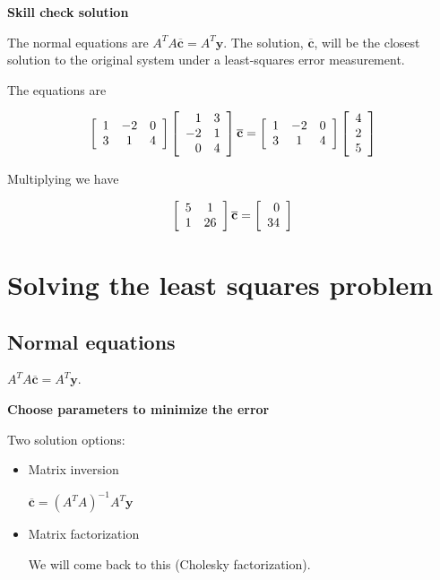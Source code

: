 \documentclass[12pt,letterpaper,noanswers]{exam}
\begin{document}
\noindent \textbf{Skill check solution}
\begin{questions}
\item The normal equations are $A^TA\overline{\mathbf{c}} = A^T\mathbf{y}$.  The solution, $\overline{\mathbf{c}}$, will be the closest solution to the original system under a least-squares error measurement.

The equations are

\[\left[\begin{array}{c c c}
1 & -2 & 0 \\
3 & 1 & 4
\end{array}\right]\left[\begin{array}{r r}
1 & 3 \\
-2 & 1 \\
0 & 4
\end{array}\right] \overline{\mathbf{c}}= \left[\begin{array}{c c c}
1 & -2 & 0 \\
3 & 1 & 4
\end{array}\right] \left[\begin{array}{ r}
4 \\ 2 \\ 5\end{array}\right]\]

Multiplying we have

\[\left[\begin{array}{c c}
5 & 1 \\
1 & 26
\end{array}\right]\overline{\mathbf{c}}= \left[\begin{array}{ r}
0 \\ 34\end{array}\right]\]

\end{questions}

\section{Solving the least squares problem}

\subsection{Normal equations}

$A^TA\overline{\mathbf{c}} = A^T\mathbf{y}$.

\noindent\textbf{Choose parameters to minimize the error}

Two solution options:
\begin{itemize}
    \item Matrix inversion

$\overline{\mathbf{c}} = (A^TA)^{-1}A^T\mathbf{y}$    
    \item Matrix factorization

We will come back to this (Cholesky factorization).
\end{itemize}
\end{document}
